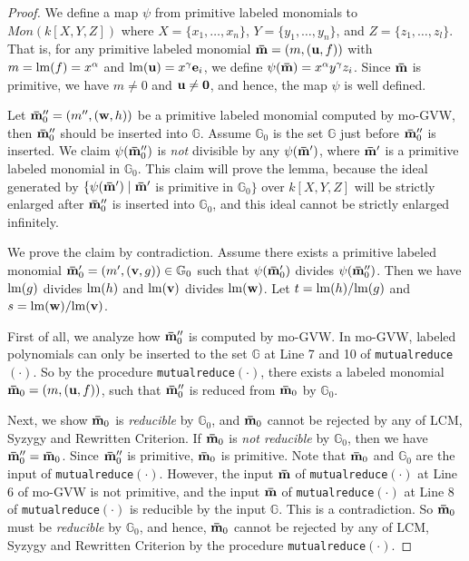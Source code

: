 \documentclass[final, number, 3p,12pt]{elsarticle}
\def\G{{\mathbb{G}}}
\def\brm{{\bf \bar{m}}}
\def\z{{\bf 0}}
\def\lm{{\rm lm}} %
\def\e{{\bf e}}
\def\u{{\bf u}}
\def\v{{\bf v}}
\def\w{{\bf w}}
\begin{document}

\begin{proof}
We define a map $\psi$ from primitive labeled monomials to $Mon(k[X, Y, Z])$ where $X=\{x_1, \ldots, x_n\}$, $Y = \{y_1, \ldots, y_n\}$, and $Z = \{z_1, \ldots, z_l\}$. That is, for any primitive labeled monomial $\brm =(m, (\u, f))$ with $m = \lm(f) = x^\alpha$ and $\lm(\u) = x^\gamma\e_i$, we define $\psi(\brm) = x^\alpha y^\gamma z_i$. Since $\brm$ is primitive, we have $m \not= 0$ and $\u \not= \z$, and hence, the map $\psi$ is well defined.

Let $\brm''_0 = (m'', (\w, h))$ be a primitive labeled monomial computed by mo-GVW, then $\brm''_0$  should be inserted into $\G$. Assume $\G_0$ is the set $\G$ just before $\brm''_0$ is inserted. We claim $\psi(\brm''_0)$ is {\em not} divisible by any $\psi(\brm')$, where $\brm'$ is a primitive labeled monomial in $\G_0$. This claim will prove the lemma, because the ideal generated by $\{\psi(\brm') \mid \brm'$ is primitive in $\G_0\}$ over $k[X, Y, Z]$ will be strictly enlarged after $\brm''_0$ is inserted into $\G_0$, and this ideal cannot be strictly enlarged infinitely.

We prove the claim by contradiction. Assume there exists a primitive labeled monomial $\brm'_0 = (m', (\v, g)) \in \G_0$ such that $\psi(\brm'_0)$ divides $\psi(\brm''_0)$. Then we have $\lm(g)$ divides $\lm(h)$ and $\lm(\v)$ divides $\lm(\w)$. Let $t = \lm(h)/\lm(g)$ and $s = \lm(\w) /\lm(\v)$. 



First of all, we analyze how $\brm''_0$ is computed by mo-GVW. In mo-GVW, labeled polynomials can only be inserted to the set $\G$ at Line 7 and 10 of {\tt mutualreduce}$(\cdot)$. So by the procedure {\tt mutualreduce}$(\cdot)$, there exists a labeled monomial $\brm_0 = (m, (\u, f))$, such that $\brm''_0$ is reduced from $\brm_0$ by $\G_0$. 


Next, we show $\brm_0$ is {\em reducible} by $\G_0$, and $\brm_0$ cannot be rejected by any of LCM, Syzygy and Rewritten Criterion. If $\brm_0$ is {\em not reducible} by $\G_0$, then we have $\brm''_0 = \brm_0$. Since $\brm''_0$ is primitive, $\brm_0$ is primitive. Note that $\brm_0$ and $\G_0$ are the input of {\tt mutualreduce}$(\cdot)$. However, the input $\brm$ of {\tt mutualreduce}$(\cdot)$ at Line 6 of mo-GVW is not primitive,  and the input $\brm$ of {\tt mutualreduce}$(\cdot)$ at Line 8 of {\tt mutualreduce}$(\cdot)$ is reducible by the input $\G$. This is a contradiction. So $\brm_0$ must be {\em reducible} by $\G_0$, and hence, $\brm_0$ cannot be rejected by any of LCM, Syzygy and Rewritten Criterion by the procedure {\tt mutualreduce}$(\cdot)$. 


\end{proof}
\end{document}
